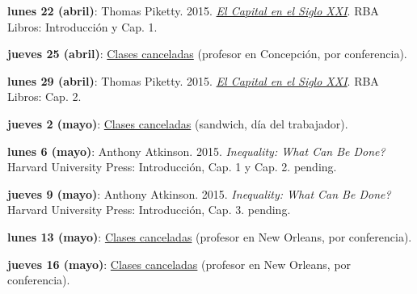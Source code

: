 \documentclass[letterpaper]{article}
\renewenvironment{itemize}{
  \begin{list}{}{
    \setlength{\leftmargin}{1.5em}
  }
}{
  \end{list}
}
\begin{document}
\begin{enumerate}
\begin{itemize}
		\vspace{0.2cm}

		\item {\bf lunes 22 (abril)}: Thomas Piketty. 2015. \href{https://github.com/hbahamonde/Intro_Ciencias_Sociales/raw/master/Readings/Piketty_El_capital.pdf}{\emph{El Capital en el Siglo XXI}}. RBA Libros: Introducci\'on y Cap. 1.

		\vspace{0.2cm}

		\item[] {\bf jueves 25 (abril)}: {\underline{Clases canceladas} (profesor en Concepci\'on, por conferencia).}

		\vspace{0.2cm}

		\item {\bf lunes 29 (abril)}: Thomas Piketty. 2015. \href{https://github.com/hbahamonde/Intro_Ciencias_Sociales/raw/master/Readings/Piketty_El_capital.pdf}{\emph{El Capital en el Siglo XXI}}. RBA Libros: Cap. 2.

		\vspace{0.2cm}

		\item[] {\bf jueves 2 (mayo)}: {\underline{Clases canceladas} (sandwich, d\'ia del trabajador).}

		\vspace{0.2cm}

		\item {\bf lunes 6 (mayo)}: Anthony Atkinson. 2015. \emph{Inequality: What Can Be Done?} Harvard University Press: Introducci\'on, Cap. 1 y Cap. 2. {\color{red}pending.}

		\vspace{0.2cm}

		\item {\bf jueves 9 (mayo)}: Anthony Atkinson. 2015. \emph{Inequality: What Can Be Done?} Harvard University Press: Introducci\'on, Cap. 3. {\color{red}pending.}

		\vspace{0.2cm}

		\item[] {\bf lunes 13 (mayo)}: {\underline{Clases canceladas} (profesor en New Orleans, por conferencia).}

		\vspace{0.2cm}

		\item[] {\bf jueves 16 (mayo)}: {\underline{Clases canceladas} (profesor en New Orleans, por conferencia).}


\end{itemize}
\end{enumerate}
\end{document}
